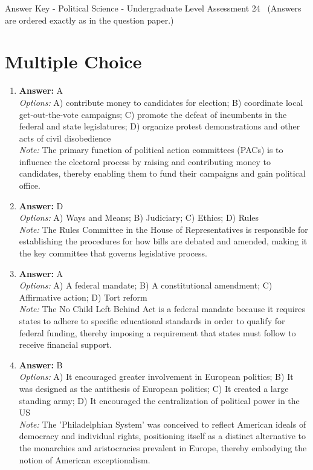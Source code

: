 \documentclass[12pt]{article}
\begin{document}
\begin{center}
Answer Key - Political Science - Undergraduate Level Assessment 24 \
\small (Answers are ordered exactly as in the question paper.)
\end{center}

\section*{Multiple Choice}
\begin{enumerate}[label=\arabic*.]
\item \textbf{Answer:} A
\\ \textit{Options:} A) contribute money to candidates for election; B) coordinate local get-out-the-vote campaigns; C) promote the defeat of incumbents in the federal and state legislatures; D) organize protest demonstrations and other acts of civil disobedience
\\ \textit{Note:} The primary function of political action committees (PACs) is to influence the electoral process by raising and contributing money to candidates, thereby enabling them to fund their campaigns and gain political office.
\item \textbf{Answer:} D
\\ \textit{Options:} A) Ways and Means; B) Judiciary; C) Ethics; D) Rules
\\ \textit{Note:} The Rules Committee in the House of Representatives is responsible for establishing the procedures for how bills are debated and amended, making it the key committee that governs legislative process.
\item \textbf{Answer:} A
\\ \textit{Options:} A) A federal mandate; B) A constitutional amendment; C) Affirmative action; D) Tort reform
\\ \textit{Note:} The No Child Left Behind Act is a federal mandate because it requires states to adhere to specific educational standards in order to qualify for federal funding, thereby imposing a requirement that states must follow to receive financial support.
\item \textbf{Answer:} B
\\ \textit{Options:} A) It encouraged greater involvement in European politics; B) It was designed as the antithesis of European politics; C) It created a large standing army; D) It encouraged the centralization of political power in the US
\\ \textit{Note:} The 'Philadelphian System' was conceived to reflect American ideals of democracy and individual rights, positioning itself as a distinct alternative to the monarchies and aristocracies prevalent in Europe, thereby embodying the notion of American exceptionalism.

\end{enumerate}
\end{document}
